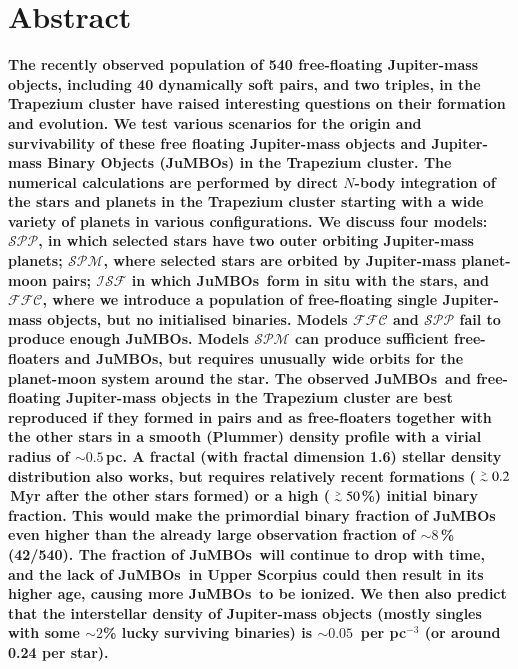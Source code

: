 \documentclass[submission,phys]{lib/SciPost}
\def\apgt{\ {\raise-.5ex\hbox{$\buildrel>\over\sim$}}\ }
\newcommand{\jumbos}{\mbox{JuMBOs}}
\begin{document}
\section*{Abstract} {\bf 
      The recently observed population of 540 free-floating
      Jupiter-mass objects, including 40 dynamically soft pairs, and
      two triples, in the Trapezium cluster have raised interesting
      questions on their formation and evolution.  We test various
      scenarios for the origin and survivability of these free
      floating Jupiter-mass objects and Jupiter-mass Binary Objects
      (JuMBOs) in the Trapezium cluster.  The numerical calculations
      are performed by direct $N$-body integration of the stars and
      planets in the Trapezium cluster starting with a wide variety of
      planets in various configurations. We discuss four models:
      $\mathcal{SPP}$, in which selected stars have two outer orbiting
      Jupiter-mass planets; $\mathcal{SPM}$, where selected stars are
      orbited by Jupiter-mass planet-moon pairs; $\mathcal{ISF}$ in
      which \jumbos\, form in situ with the stars, and
      $\mathcal{FFC}$, where we introduce a population of
      free-floating single Jupiter-mass objects, but no initialised
      binaries.  Models $\mathcal{FFC}$ and $\mathcal{SPP}$ fail to
      produce enough \jumbos. Models $\mathcal{SPM}$ can produce
      sufficient free-floaters and \jumbos\/, but requires unusually
      wide orbits for the planet-moon system around the star. The
      observed \jumbos\ and free-floating Jupiter-mass objects in the
      Trapezium cluster are best reproduced if they formed in pairs
      and as free-floaters together with the other stars in a smooth
      (Plummer) density profile with a virial radius of $\sim
      0.5$\,pc.  A fractal (with fractal dimension 1.6) stellar
      density distribution also works, but requires relatively recent
      formations ($\apgt 0.2$\,Myr after the other stars formed) or a
      high ($\apgt 50$\%) initial binary fraction.  This would make
      the primordial binary fraction of \jumbos\, even higher than the
      already large observation fraction of $\sim 8$\,\% (42/540). The
      fraction of \jumbos\, will continue to drop with time, and the
      lack of \jumbos\ in Upper Scorpius could then result in its
      higher age, causing more \jumbos\, to be ionized. We then also
      predict that the interstellar density of Jupiter-mass objects
      (mostly singles with some $\sim 2$\% lucky surviving binaries)
      is $\sim 0.05$\, per pc$^{-3}$ (or around 0.24 per star). }
\end{document}
